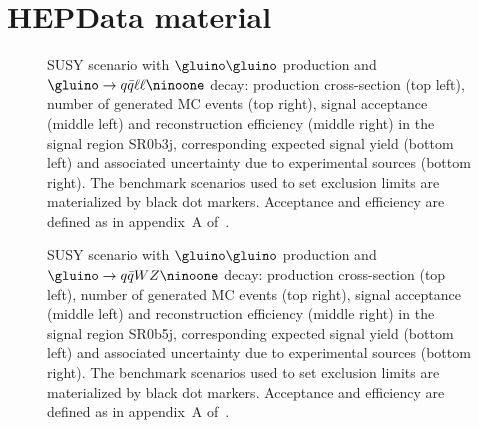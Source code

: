 \clearpage
\section{HEPData material}
\label{App:HEPData}



\begin{figure}[b!]
\centering
{}
\caption{SUSY scenario with $\gluino\gluino$ production and $\gluino\to q\bar q\ell\ell\ninoone$ decay: 
production cross-section (top left), number of generated MC events (top right), 
signal acceptance (middle left) and reconstruction efficiency (middle right) in the signal region SR0b3j, 
corresponding expected signal yield (bottom left) and associated uncertainty due to experimental sources (bottom right). 
The benchmark scenarios used to set exclusion limits are materialized by black dot markers. 
Acceptance and efficiency are defined as in appendix~A of~\cite{SUSY-2013-19}.}
\label{HEPData_SR0b3j}
\end{figure}

\begin{figure}[p]
\centering
{}
\caption{SUSY scenario with $\gluino\gluino$ production and $\gluino\to q\bar qWZ\ninoone$ decay: 
production cross-section (top left), number of generated MC events (top right), 
signal acceptance (middle left) and reconstruction efficiency (middle right) in the signal region SR0b5j, 
corresponding expected signal yield (bottom left) and associated uncertainty due to experimental sources (bottom right). 
The benchmark scenarios used to set exclusion limits are materialized by black dot markers. 
Acceptance and efficiency are defined as in appendix~A of~\cite{SUSY-2013-19}.}
\label{HEPData_SR0b5j} 
\end{figure}

